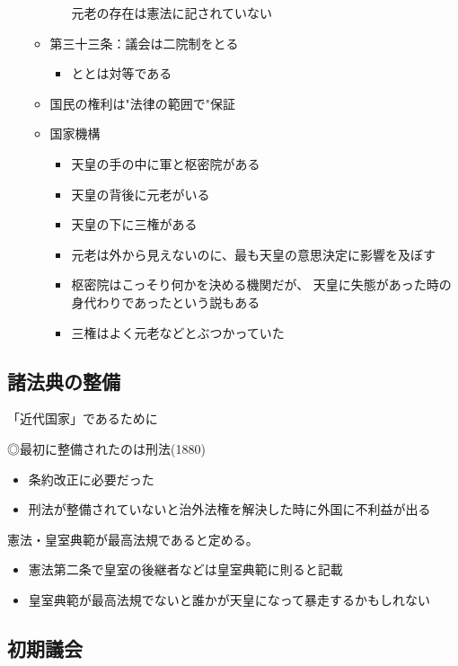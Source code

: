 \documentclass[12pt,fleqn]{ltjsarticle}
\begin{document}
\begin{itemize}
\begin{itemize}
\begin{itemize}
元老の存在は憲法に記されていない
\end{itemize}
\item 第三十三条：議会は二院制をとる
\begin{itemize}
\item {}ととは対等である

\end{itemize}

\item 国民の権利は"法律の範囲で"保証
\item 国家機構
\begin{itemize}
\item 天皇の手の中に軍と枢密院がある
\item 天皇の背後に元老がいる
\item 天皇の下に三権がある

\item 元老は外から見えないのに、最も天皇の意思決定に影響を及ぼす
\item 枢密院はこっそり何かを決める機関だが、
天皇に失態があった時の身代わりであったという説もある
\item 三権はよく元老などとぶつかっていた
\end{itemize}
\end{itemize}
\end{itemize}

\subsection{諸法典の整備}
「近代国家」であるために

◎最初に整備されたのは刑法(1880)
\begin{itemize}
\item 条約改正に必要だった
\item 刑法が整備されていないと治外法権を解決した時に外国に不利益が出る
\end{itemize}

 憲法・皇室典範が最高法規であると定める。
\begin{itemize}
\item 憲法第二条で皇室の後継者などは皇室典範に則ると記載
\item 皇室典範が最高法規でないと誰かが天皇になって暴走するかもしれない
\end{itemize}

\subsection{初期議会}
\end{document}
